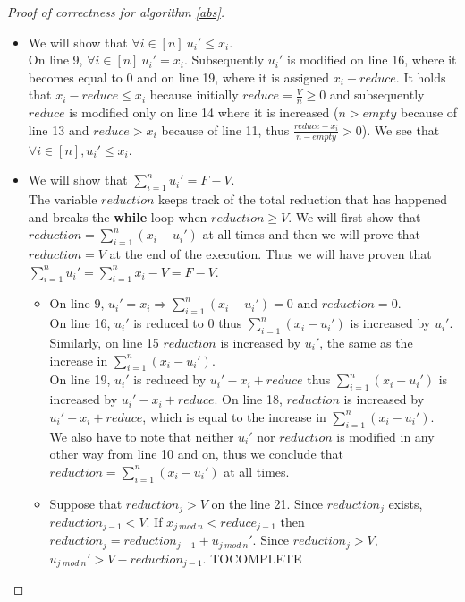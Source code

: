 \documentclass[11pt]{article}
\theoremstyle{definition}
\theoremstyle{corollary}
\theoremstyle{lemma}
\begin{document}
    \begin{proof}[Proof of correctness for algorithm \ref{abs}] \
       \begin{itemize}
          \item We will show that $\forall i \in [n] \: u_i' \leq x_i$. \\
          On line 9, $\forall i \in [n] \: u_i' = x_i$. Subsequently $u_i'$ is modified on line 16, where
          it becomes equal to 0 and on line 19, where it is assigned $x_i - reduce$. It holds that $x_i - reduce \leq x_i$
          because initially $reduce = \frac{V}{n} \geq 0$ and subsequently $reduce$ is modified only on line 14 where it
          is increased ($n > empty$ because of line 13 and $reduce > x_i$ because of line 11, thus
          $\frac{reduce - x_i}{n - empty} > 0$). We see that $\forall i \in [n], u_i' \leq x_i$.
          \item We will show that $\sum\limits_{i=1}^{n}u_i' = F - V$. \\
          The variable $reduction$ keeps track of the total reduction that has happened and breaks the \textbf{while} loop
          when $reduction \geq V$. We will first show that $reduction = \sum\limits_{i=1}^{n}(x_i- u_i')$ at all times and
          then we will prove that $reduction = V$ at the end of the execution. Thus we will have proven that
          $\sum\limits_{i=1}^{n}u_i'= \sum\limits_{i=1}^{n}x_i - V = F - V$.
          \begin{itemize}
             \item On line 9, $u_i' = x_i \Rightarrow \sum\limits_{i=1}^{n}(x_i- u_i') = 0$ and $reduction = 0$. \\
             On line 16, $u_i'$ is reduced to 0 thus $\sum\limits_{i=1}^{n}(x_i- u_i')$ is increased by $u_i'$.
             Similarly, on line 15 $reduction$ is increased by $u_i'$, the same as the increase in
             $\sum\limits_{i=1}^{n}(x_i- u_i')$. \\
             On line 19, $u_i'$ is reduced by $u_i' - x_i + reduce$ thus $\sum\limits_{i=1}^{n}(x_i- u_i')$ is increased
             by $u_i' - x_i + reduce$. On line 18, $reduction$ is increased by $u_i' - x_i + reduce$, which is equal
             to the increase in $\sum\limits_{i=1}^{n}(x_i- u_i')$. \\
             We also have to note that neither $u_i'$ nor $reduction$ is modified in any other way from line 10 and on,
             thus we conclude that $reduction = \sum\limits_{i=1}^{n}(x_i- u_i')$ at all times.
             \item Suppose that $reduction_j > V$ on the line 21. Since $reduction_j$ exists, $reduction_{j-1} < V$.
             If $x_{j \: mod \: n} < reduce_{j-1}$ then $reduction_j = reduction_{j-1} + u_{j \: mod \:n}'$.
             Since $reduction_j > V$, $u_{j \: mod \:n}' > V - reduction_{j-1}$. TOCOMPLETE\\
             
          \end{itemize}
       \end{itemize}
    \end{proof}
\end{document}
